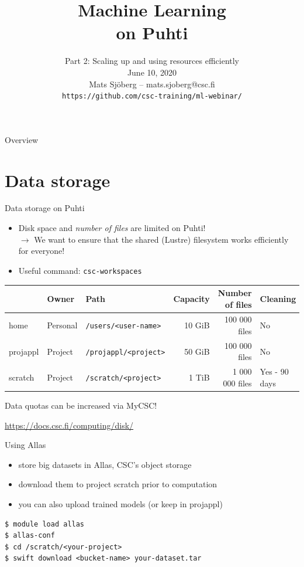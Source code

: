 \documentclass[aspectratio=1610,14pt]{beamer}
\title{Machine Learning\\on Puhti}
\subtitle{Part 2: Scaling up and using resources efficiently\\[5mm]
  June 10, 2020\\
  Mats Sjöberg -- mats.sjoberg@csc.fi\\[5mm]
  \tt{\footnotesize https://github.com/csc-training/ml-webinar/}}
\newcommand{\link}[1]{\alert{\url{#1}}}
\begin{document}
\begin{frame}{Overview}
  \tableofcontents
\end{frame}

\section{Data storage}

\begin{frame}{Data storage on Puhti}

  \begin{itemize}
  \item Disk space and \emph{number of files} are limited on Puhti! \\
    {\small $\rightarrow$ We want to ensure that the shared (Lustre) filesystem works
    efficiently for everyone!}
  \item Useful command: {\tt csc-workspaces}
  \end{itemize}

  \vfill

  {\footnotesize
    \begin{tabular}{lllrrl}
             & Owner    & Path                      & Capacity & Number of files & Cleaning \\
    \hline
    home     & Personal & {\tt /users/<user-name>}  & 10 GiB   & 100 000 files   & No \\
    projappl & Project  & {\tt /projappl/<project>} & 50 GiB   & 100 000 files   & No \\
    scratch  & Project  & {\tt /scratch/<project>}  & 1 TiB    & 1 000 000 files & Yes - 90 days \\
    \end{tabular}
  }
  \vfill
  {\small
    Data quotas can be increased via MyCSC!

    \link{https://docs.csc.fi/computing/disk/}}
\end{frame}

\begin{frame}[fragile]{Using Allas}
  \begin{itemize}
  \item store big datasets in Allas, CSC's object storage
  \item download them to project scratch prior to computation
  \item you can also upload trained models (or keep in projappl)
  \end{itemize}

  \vfill
  
\begin{verbatim}
$ module load allas
$ allas-conf
$ cd /scratch/<your-project>
$ swift download <bucket-name> your-dataset.tar  
\end{verbatim}
\end{frame}
\end{document}
